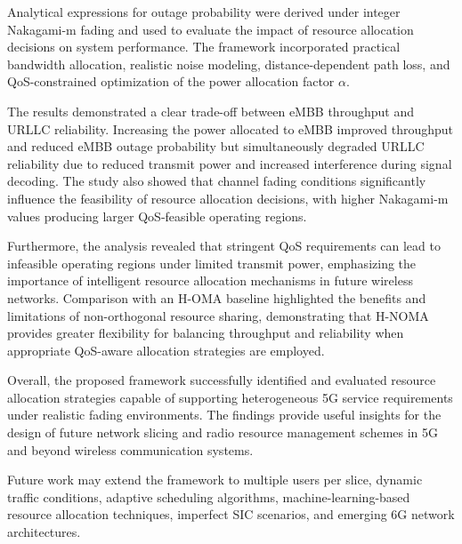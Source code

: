 \documentclass[
]{article}
\begin{document}
Analytical expressions for outage probability were derived under integer
Nakagami-m fading and used to evaluate the impact of resource allocation
decisions on system performance. The framework incorporated practical
bandwidth allocation, realistic noise modeling, distance-dependent path
loss, and QoS-constrained optimization of the power allocation factor \(α\).

The results demonstrated a clear trade-off between eMBB throughput and
URLLC reliability. Increasing the power allocated to eMBB improved
throughput and reduced eMBB outage probability but simultaneously
degraded URLLC reliability due to reduced transmit power and increased
interference during signal decoding. The study also showed that channel
fading conditions significantly influence the feasibility of resource
allocation decisions, with higher Nakagami-m values producing larger
QoS-feasible operating regions.

Furthermore, the analysis revealed that stringent QoS requirements can
lead to infeasible operating regions under limited transmit power,
emphasizing the importance of intelligent resource allocation mechanisms
in future wireless networks. Comparison with an H-OMA baseline
highlighted the benefits and limitations of non-orthogonal resource
sharing, demonstrating that H-NOMA provides greater flexibility for
balancing throughput and reliability when appropriate QoS-aware
allocation strategies are employed.

Overall, the proposed framework successfully identified and evaluated
resource allocation strategies capable of supporting heterogeneous 5G
service requirements under realistic fading environments. The findings
provide useful insights for the design of future network slicing and
radio resource management schemes in 5G and beyond wireless
communication systems.

Future work may extend the framework to multiple users per slice,
dynamic traffic conditions, adaptive scheduling algorithms,
machine-learning-based resource allocation techniques, imperfect SIC
scenarios, and emerging 6G network architectures.


\clearpage

\cleardoublepage
{}
{}
\printbibliography[title={References}]
\end{document}
